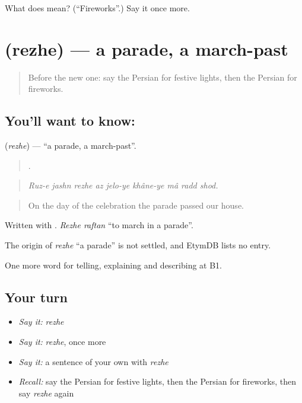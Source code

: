 \begin{tcolorbox}[breakable,colback=teal!4,colframe=teal!35!black,title={Before you move on}]
What does   mean? (\textquotedblleft{}Fireworks\textquotedblright{}.) Say it once more.
\end{tcolorbox}
\section[\texorpdfstring{\fa{رژه} (rezhe)}{رژه (rezhe)}]{ (rezhe) — a parade, a march-past}

\label{lesson:FA-C342-rezhe}



\begin{quote}
Before the new one: say the Persian for festive lights, then the Persian for fireworks.
\end{quote}

\subsection*{You'll want to know: }
\textbf{} (\emph{rezhe}) — \textquotedblleft{}a parade, a march-past\textquotedblright{}.

\begin{quote}
        .
\end{quote}

\begin{quote}
\emph{Ruz-e jashn rezhe az jelo-ye khâne-ye mâ radd shod.}
\end{quote}

\begin{quote}
On the day of the celebration the parade passed our house.
\end{quote}

Written with . \emph{Rezhe raftan} \textquotedblleft{}to march in a parade\textquotedblright{}.

\begin{cousinweb}
The origin of \emph{rezhe} \textquotedblleft{}a parade\textquotedblright{} is not settled, and EtymDB lists no entry.
\end{cousinweb}

\begin{grammarlens}[title={What you've built}]
One more word for telling, explaining and describing at B1.
\end{grammarlens}

\subsection*{Your turn}
\begin{itemize}
\raggedright
  \item \emph{Say it:} \emph{rezhe}
  \item \emph{Say it:} \emph{rezhe}, once more
  \item \emph{Say it:} a sentence of your own with \emph{rezhe}
  \item \emph{Recall:} say the Persian for festive lights, then the Persian for fireworks, then say \emph{rezhe} again
\end{itemize}

